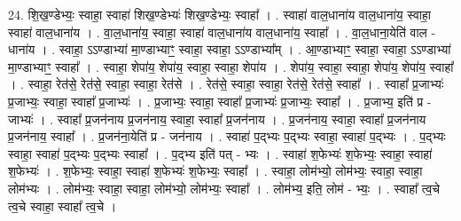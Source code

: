 \documentclass[17pt]{extarticle}
\begin{document}
24. शि॒ख॒ण्डेभ्यः॒ स्वाहा॒ स्वाहा॑ शिख॒ण्डेभ्यः॑ शिख॒ण्डेभ्यः॒ स्वाहा᳚ । . स्वाहा॑ वाल॒धाना॑य वाल॒धाना॑य॒ स्वाहा॒ स्वाहा॑ वाल॒धाना॑य । . वा॒ल॒धाना॑य॒ स्वाहा॒ स्वाहा॑ वाल॒धाना॑य वाल॒धाना॑य॒ स्वाहा᳚ । . वा॒ल॒धाना॒येति॑ वाल - धाना॑य । . स्वाहा॒ ऽऽण्डाभ्या॑ मा॒ण्डाभ्याꣳ॒॒ स्वाहा॒ स्वाहा॒ ऽऽण्डाभ्या᳚म् । . आ॒ण्डाभ्याꣳ॒॒ स्वाहा॒ स्वाहा॒ ऽऽण्डाभ्या॑ मा॒ण्डाभ्याꣳ॒॒ स्वाहा᳚ । . स्वाहा॒ शेपा॑य॒ शेपा॑य॒ स्वाहा॒ स्वाहा॒ शेपा॑य । . शेपा॑य॒ स्वाहा॒ स्वाहा॒ शेपा॑य॒ शेपा॑य॒ स्वाहा᳚ । . स्वाहा॒ रेत॑से॒ रेत॑से॒ स्वाहा॒ स्वाहा॒ रेत॑से । . रेत॑से॒ स्वाहा॒ स्वाहा॒ रेत॑से॒ रेत॑से॒ स्वाहा᳚ । . स्वाहा᳚ प्र॒जाभ्यः॑ प्र॒जाभ्यः॒ स्वाहा॒ स्वाहा᳚ प्र॒जाभ्यः॑ । . प्र॒जाभ्यः॒ स्वाहा॒ स्वाहा᳚ प्र॒जाभ्यः॑ प्र॒जाभ्यः॒ स्वाहा᳚ । . प्र॒जाभ्य॒ इति॑ प्र - जाभ्यः॑ । . स्वाहा᳚ प्र॒जन॑नाय प्र॒जन॑नाय॒ स्वाहा॒ स्वाहा᳚ प्र॒जन॑नाय । . प्र॒जन॑नाय॒ स्वाहा॒ स्वाहा᳚ प्र॒जन॑नाय प्र॒जन॑नाय॒ स्वाहा᳚ । . प्र॒जन॑ना॒येति॑ प्र - जन॑नाय । . स्वाहा॑ प॒द्भ्यः प॒द्भ्यः स्वाहा॒ स्वाहा॑ प॒द्भ्यः । . प॒द्भ्यः स्वाहा॒ स्वाहा॑ प॒द्भ्यः प॒द्भ्यः स्वाहा᳚ । . प॒द्भ्य इति॑ पत् - भ्यः । . स्वाहा॑ श॒फेभ्यः॑ श॒फेभ्यः॒ स्वाहा॒ स्वाहा॑ श॒फेभ्यः॑ । . श॒फेभ्यः॒ स्वाहा॒ स्वाहा॑ श॒फेभ्यः॑ श॒फेभ्यः॒ स्वाहा᳚ । . स्वाहा॒ लोम॑भ्यो॒ लोम॑भ्यः॒ स्वाहा॒ स्वाहा॒ लोम॑भ्यः । . लोम॑भ्यः॒ स्वाहा॒ स्वाहा॒ लोम॑भ्यो॒ लोम॑भ्यः॒ स्वाहा᳚ । . लोम॑भ्य॒ इति॒ लोम॑ - भ्यः॒ । . स्वाहा᳚ त्व॒चे त्व॒चे स्वाहा॒ स्वाहा᳚ त्व॒चे । \newline
\end{document}
